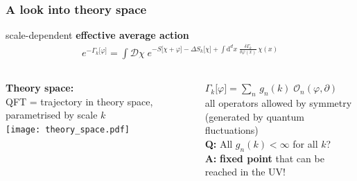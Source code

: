 \documentclass[]{beamer}  %
\begin{document}
\begin{frame}
  \frametitle{A look into theory space}
  scale-dependent \textbf{effective average action}
  \begin{align*}
    \boxed{
    e^{ - \Gamma_k \lbrack \varphi \rbrack }
    = \int \mathcal D \chi \;
    e^{
      - S \lbrack \chi + \varphi \rbrack
      - \Delta S_k \lbrack \chi \rbrack
      + \int \mathrm d^dx \;
      \frac{ \delta \Gamma_k }{ \delta \varphi (x) }
      \, \chi(x)
    }
    }
  \end{align*}
  \vspace{2pt}

  \begin{columns}[T]
    \begin{column}{.4\textwidth}
      \textbf{Theory space:}\\[5pt]
      QFT = trajectory in theory space,
      parametrised by scale $k$\\[25pt]
      \texttt{[image: theory\_space.pdf]}
    \end{column}
    \begin{column}{.6\textwidth}
      \begin{center}
        $\Gamma_k \lbrack \varphi \rbrack = \sum_n \, g_n(k) \; \mathcal O_n(\varphi, \partial)$\\[5pt]
        all operators allowed by symmetry\\[3pt]
        (generated by quantum fluctuations)\\[20pt]
        \pause
        \textbf{Q:} All $g_n(k)<\infty$ for all $k$?\\[5pt]
        \textbf{A:} \textbf{fixed point} that can be reached in the UV!
      \end{center}
    \end{column}
  \end{columns}
\end{frame}
\end{document}
